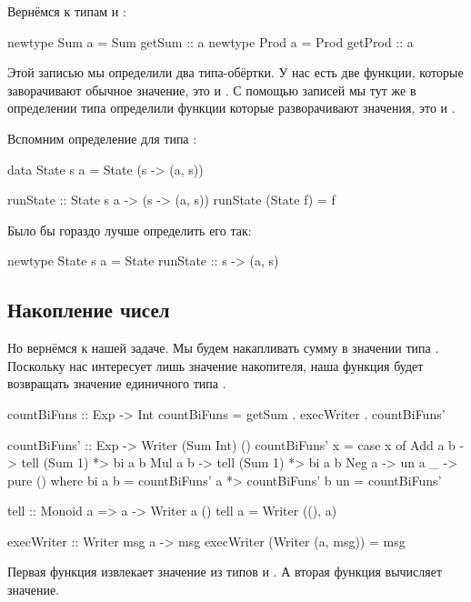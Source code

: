 Вернёмся к типам  и :

\begin{code}
newtype Sum  a = Sum  { getSum  :: a }
newtype Prod a = Prod { getProd :: a }
\end{code}

Этой записью мы определили два типа-обёртки.
У нас есть две функции, которые заворачивают
обычное значение, это  и .
С помощью записей мы тут же в определении типа
определили функции которые разворачивают значения, 
это  и .

Вспомним определение для типа :

\begin{code}
data State s a = State (s -> (a, s))

runState :: State s a -> (s -> (a, s))
runState (State f) = f
\end{code}

Было бы гораздо лучше определить его так:

\begin{code}
newtype State s a = State{ runState :: s -> (a, s) }
\end{code}

\subsection{Накопление чисел}

Но вернёмся к нашей задаче. Мы будем накапливать
сумму в значении типа . Поскольку нас интересует
лишь значение накопителя, наша функция будет
возвращать значение единичного типа \In{()}. 

\begin{code}
countBiFuns :: Exp -> Int
countBiFuns = getSum . execWriter . countBiFuns'

countBiFuns' :: Exp -> Writer (Sum Int) ()
countBiFuns' x = case x of
    Add a b -> tell (Sum 1) *> bi a b
    Mul a b -> tell (Sum 1) *> bi a b
    Neg a   -> un a
    _       -> pure ()
    where bi a b = countBiFuns' a *> countBiFuns' b  
          un     = countBiFuns'

tell :: Monoid a => a -> Writer a () 
tell a = Writer ((), a)

execWriter :: Writer msg a -> msg
execWriter (Writer (a, msg)) = msg
\end{code}

Первая функция  извлекает значение
из типов  и . А вторая функция
 вычисляет значение.

